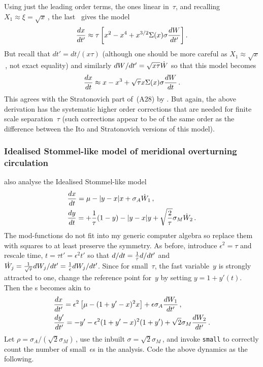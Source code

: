 \documentclass[11pt,a5paper]{article}
\begin{document}
Using just the leading order terms, the ones linear in~$\tau$, and recalling $X_1\approx \xi=\sqrt x$\,, the last \sde\ gives the model
\begin{equation*}
\de{t'}x\approx \tau\left[ x^2-x^4+x^{3/2}\Sigma(x)\sigma \de{t'} W\right].
\end{equation*}
But recall that $dt'=dt/(x\tau)$ (although one should be more careful as $X_1\approx \sqrt x$\,, not exact equality) and similarly $\de{t'}W=\sqrt{x\tau}\dot W$ so that this model becomes
\begin{equation*}
\de{t}x\approx x-x^3+\sqrt{\tau}x \Sigma(x)\sigma \de{t} W\,.
\end{equation*}
This agrees with the Stratonovich part of~(A28) by \cite{Monahan2011}.
But again, the above derivation has the systematic higher order corrections that are needed for finite scale separation~$\tau$ (such corrections appear to be of the same order as the difference between the Ito and Stratonovich versions of this model).


\subsubsection{Idealised Stommel-like model of meridional overturning circulation}

\cite{Monahan2011} also analyse the Idealised Stommel-like model
\begin{align*}
&\de tx=\mu-|y-x|x+\sigma_A\dot W_1\,,
\\&\de ty=+\frac1\tau(1-y)-|y-x|y+\sqrt{\frac2\tau}\sigma_M\dot W_2\,.
\end{align*}
The mod-functions do not fit into my generic computer algebra so replace them with squares to at least preserve the symmetry.
As before, introduce $\epsilon^2=\tau$ and rescale time, $t=\tau t'=\epsilon^2t'$  so that $\de t{}=\frac1\tau\de{t'}{}$ and $\dot W_j=\frac1{\sqrt{\tau}}\de {t'}{W_j}=\frac1{\epsilon}\de {t'}{W_j}$.
Since for small~$\tau$, the fast variable~$y$ is strongly attracted to one, change the reference point for~$y$ by setting $y=1+y'(t)$.
Then the \sde{}s becomes akin to
\begin{align*}
&\de {t'}x=\epsilon^2\left[\mu-(1+y'-x)^2x\right]+\epsilon\sigma_A\de{t'}{W_1}\,,
\\&\de {t'}{y'}=-y'-\epsilon^2(1+y'-x)^2(1+y')+\sqrt{2}\sigma_M\de{t'}{W_2}\,.
\end{align*}
Let $\rho=\sigma_A/(\sqrt2\sigma_M)$\,, use the inbuilt $\sigma=\sqrt2\sigma_M$\,, and invoke \verb|small| to correctly count the number of small~$\epsilon$s in the analysis.
Code the above dynamics as the following.
\end{document}
